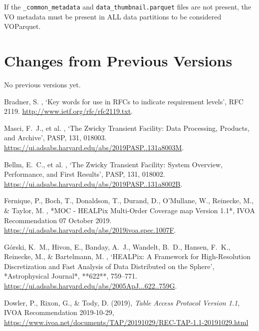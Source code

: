 \documentclass[11pt,a4paper]{ivoa}
\begin{document}
If the \texttt{\_common\_metadata} and \texttt{data\_thumbnail.parquet} files are not present, the VO metadata must be present in ALL data partitions to be considered VOParquet.

\appendix
\section{Changes from Previous Versions}
No previous versions yet.

% 
\begin{thebibliography}{}

Bradner, S.  \harvardyearright , `Key words for use in
  {RFCs} to indicate requirement levels', RFC 2119.
\newblock \url{http://www.ietf.org/rfc/rfc2119.txt}.

Masci, F.~J., et al. \harvardyearright,
`The Zwicky Transient Facility: Data Processing, Products, and Archive',
PASP, 131, 018003. \url{https://ui.adsabs.harvard.edu/abs/2019PASP..131a8003M}.

Bellm, E.~C., et al. \harvardyearright,
`The Zwicky Transient Facility: System Overview, Performance, and First Results',
PASP, 131, 018002. \url{https://ui.adsabs.harvard.edu/abs/2019PASP..131a8002B}.

Fernique, P., Boch, T., Donaldson, T., Durand, D., O'Mullane, W., Reinecke, M., \& Taylor, M.  
\harvardyearright,  
*MOC - HEALPix Multi-Order Coverage map Version 1.1*,  
IVOA Recommendation 07 October 2019.  
\url{https://ui.adsabs.harvard.edu/abs/2019ivoa.spec.1007F}.

G{\'o}rski, K.~M., Hivon, E., Banday, A.~J., Wandelt, B.~D., Hansen, F.~K., Reinecke, M., \& Bartelmann, M.  
\harvardyearright,  
`HEALPix: A Framework for High-Resolution Discretization and Fast Analysis of Data Distributed on the Sphere',  
*Astrophysical Journal*, **622**, 759–771.  
\url{https://ui.adsabs.harvard.edu/abs/2005ApJ...622..759G}.

Dowler, P., Rixon, G., \& Tody, D. (2019),
\emph{Table Access Protocol Version 1.1},
IVOA Recommendation 2019-10-29, \url{https://www.ivoa.net/documents/TAP/20191029/REC-TAP-1.1-20191029.html}


\end{thebibliography}
\end{document}

